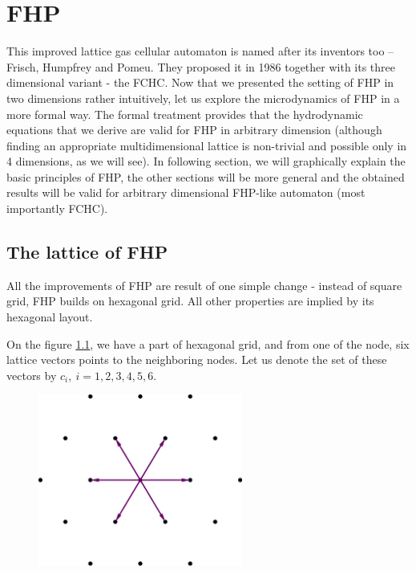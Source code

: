 \chapter{FHP}
This improved lattice gas cellular automaton is named after its inventors too -- Frisch, Humpfrey and Pomeu. 
They proposed it in 1986 together with its three dimensional variant - the FCHC. 
%
Now that we presented the setting of FHP in two dimensions rather intuitively, let us explore the microdynamics of FHP in a more formal way. The formal treatment provides that the hydrodynamic equations that we derive are valid for FHP in arbitrary dimension (although finding an appropriate multidimensional lattice is non-trivial and possible only in 4 dimensions, as we will see).
In following section, we will graphically explain the basic principles of FHP, the other sections will be more general and the obtained results will be valid for arbitrary dimensional FHP-like automaton (most importantly FCHC).

\section{The lattice of FHP}
All the improvements of FHP are result of one simple change - instead of square grid, FHP builds on hexagonal grid. All other properties are implied by its hexagonal layout.
%

On the figure \ref{FHPgrid}, we have a part of hexagonal grid, and from one of the node, six lattice vectors points to the neighboring nodes.
Let us denote the set of these vectors by $c_i,~i=1,2,3,4,5,6$.


\begin{figure}[htbp] \label{FHPgrid}
 \centering
 \includegraphics[width=0.6\textwidth]{./img/fhp_desc}
\end{figure}

